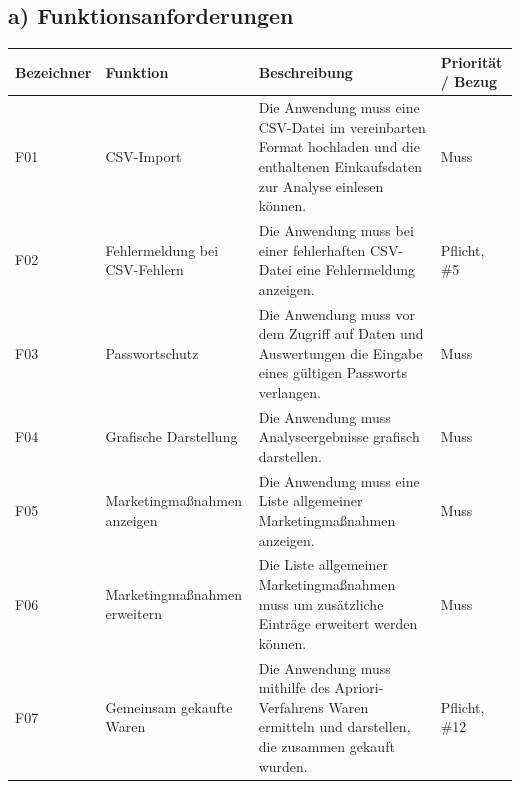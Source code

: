 \documentclass[a4paper,10pt]{article}
\renewcommand{\arraystretch}{1.15}
\begin{document}
        \subsection*{a) Funktionsanforderungen}
        \begingroup
\renewcommand{\arraystretch}{1.10}
\begin{longtable}{>{\raggedright\arraybackslash}p{}>{\raggedright\arraybackslash}p{}>{\raggedright\arraybackslash}p{}>{\raggedright\arraybackslash}p{}}

            \toprule
            \textbf{Bezeichner} & \textbf{Funktion}                              & \textbf{Beschreibung}                                                                                                             & \textbf{Priorität / Bezug} \\
            \midrule\endhead
            \bottomrule\endfoot
            F01                 & CSV-Import                                     & Die Anwendung muss eine CSV-Datei im vereinbarten Format hochladen und die enthaltenen Einkaufsdaten zur Analyse einlesen können. & Muss \\
            \midrule
            F02                 & Fehlermeldung bei CSV-Fehlern                  & Die Anwendung muss bei einer fehlerhaften CSV-Datei eine Fehlermeldung anzeigen. & Pflicht, \#5 \\
            \midrule
            F03                 & Passwortschutz                                 & Die Anwendung muss vor dem Zugriff auf Daten und Auswertungen die Eingabe eines gültigen Passworts verlangen. & Muss \\
            \midrule
            F04                 & Grafische Darstellung                          & Die Anwendung muss Analyseergebnisse grafisch darstellen. & Muss \\
            \midrule
            F05                 & Marketingma\ss{}nahmen anzeigen                & Die Anwendung muss eine Liste allgemeiner Marketingma\ss{}nahmen anzeigen. & Muss \\
            \midrule
            F06                 & Marketingma\ss{}nahmen erweitern               & Die Liste allgemeiner Marketingma\ss{}nahmen muss um zusätzliche Einträge erweitert werden können. & Muss \\
            \midrule
            F07                 & Gemeinsam gekaufte Waren                       & Die Anwendung muss mithilfe des Apriori-Verfahrens Waren ermitteln und darstellen, die zusammen gekauft wurden. & Pflicht, \#12 \\

\end{longtable}
\end{document}

